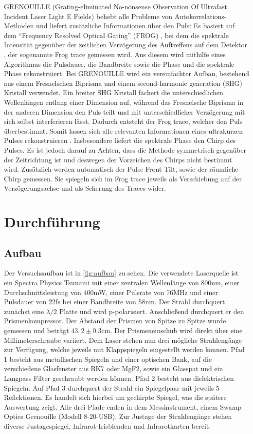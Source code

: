 \documentclass[twoside,        %
               BCOR12mm,       %
               english,ngerman, %
               fleqn,headsepline=false,footsepline=false
              ]{Vorlage/MFPREPORT}
\begin{document}
GRENOUILLE (Grating-eliminated No-nonsense Observation Of Ultrafast Incident
Laser Light E Fields) behebt alle Probleme von Autokorrelations-Methoden und
liefert zusätzliche Informationen über den Puls: Es basiert auf dem ``Frequency
Resolved Optical Gating'' (FROG) \cite{Trebino2012}, bei dem die spektrale Intensität gegenüber
der zeitlichen Verzögerung des Auftreffens auf dem Detektor , der sogenannte
Frog trace gemessen wird. Aus diesem wird mithilfe eines Algorithmus die
Pulsdauer, die Bandbreite sowie die Phase und die spektrale Phase
rekonstruiert. Bei GRENOUILLE wird ein vereinfachter Aufbau, bestehend aus
einem Fresnelschen Biprisma und einem second-harmonic generation (SHG) Kristall
verwendet. Ein breiter SHG Kristall fächert die unterschiedlichen Wellenlängen entlang einer Dimension
auf, während das Fresnelsche Biprisma in der anderen Dimension den Puls teilt
und mit unterschiedlicher Verzögerung mit sich selbst interferieren lässt.
Dadurch entsteht der Frog trace, welcher den Puls überbestimmt. Somit lassen
sich alle relevanten Informationen eines ultrakurzen Pulses rekonstruieren
\cite{SwampOpticsFrog}. Insbesondere liefert die spektrale Phase den Chirp des Pulses. Es ist
jedoch darauf zu Achten, dass die Methode symmetrisch gegenüber der
Zeitrichtung ist und deswegen der Vorzeichen des Chirps nicht bestimmt wird.
Zusätzlich werden automatisch der Pulse Front Tilt, sowie der räumliche Chirp
gemessen. Sie spiegeln sich im Frog trace jeweils als Verschiebung auf der
Verzögerungsachse und als Scherung des Traces wider.



\section{Durchführung}
\label{sec:durchfuehrung}
\subsection{Aufbau}
Der Versuchsaufbau ist in \cref{fig:aufbau} zu sehen. Die verwendete Laserquelle
ist ein Spectra Physics Tsunami mit einer zentralen Wellenlänge von 800\;nm,
einer Durchschnittsleistung von 400\;mW, einer Pulsrate von 76\;MHz und einer
Pulsdauer von 22\;fs bei einer Bandbreite von 58\;nm. Der Strahl durchquert
zunächst eine $\lambda/2$ Platte und wird p-polarisiert. Anschließend
durchquert er den Prismenkompressor. Der Abstand der Prismen von Spitze zu
Spitze wurde gemessen und beträgt $43,2\pm0.3$\;cm. Der Prismeneinschub wird
direkt über eine Millimeterschraube variiert. Dem Laser stehen nun
drei mögliche Strahlengänge zur Verfügung, welche jeweils mit Klappspiegeln
eingestellt werden können. Pfad 1 besteht aus metallischen Spiegeln und einer
optischen Bank, auf die verschiedene Glasfenster aus BK7 oder MgF2, sowie ein
Glasspat und ein Langpass Filter geschraubt werden können. Pfad 2 besteht aus
dielektrischen Spiegeln. Auf Pfad 3 durchquert der Strahl ein Spiegelpaar mit
jeweils 5 Reflektionen. Es handelt sich hierbei um gechirpte Spiegel, was die
spätere Auswertung zeigt. Alle drei Pfade enden in dem Messinstrument, einem
Swamp Optics Grenouille (Modell 8-20-USB). Zur Justage der Strahlengänge stehen
diverse Justagespiegel, Infrarot-Irisblenden und Infrarotkarten bereit.
\end{document}
